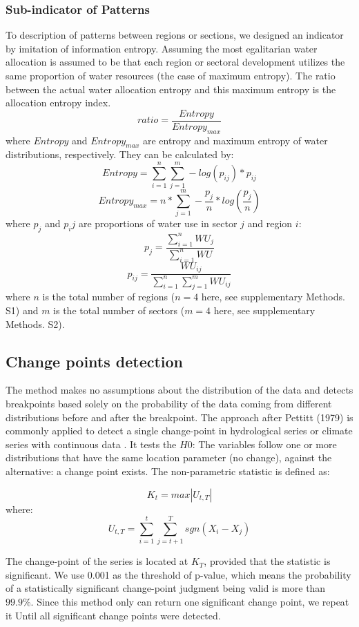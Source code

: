 \documentclass[9pt, twocolumn, twoside, lineno]{pnas-new}
\begin{document}
{	\subsubsection*{Sub-indicator of Patterns}
	To description of patterns between regions or sections, we designed an indicator by imitation of information entropy. Assuming the most egalitarian water allocation is assumed to be that each region or sectoral development utilizes the same proportion of water resources (the case of maximum entropy). The ratio between the actual water allocation entropy and this maximum entropy is the allocation entropy index.
	$$ ratio = \frac{Entropy}{Entropy_{max}} $$
	where $Entropy$ and $Entropy_{max}$ are entropy and maximum entropy of water distributions, respectively. They can be calculated by:
	$$ Entropy = \sum_{i=1}^n \sum_{j=1}^m -log(p_{ij}) * p_{ij} $$
	$$ Entropy_{max} = n * \sum_{j=1}^m -\frac{p_j}{n} * log(\frac{p_j}{n}) $$ 
	where $p_j$ and $p_ij$ are proportions of water use in sector $j$ and region $i$:
	$$ p_j = \frac{\sum_{i=1}^n WU_j}{\sum_{i=1}^n WU} $$
	$$ p_{ij} = \frac{WU_{ij}} {\sum_{i=1}^n \sum_{j=1}^m WU_{ij}} $$
	where $n$ is the total number of regions ($n=4$ here, see supplementary Methods. S1) and $m$ is the total number of sectors ($m=4$ here, see supplementary Methods. S2).

	\subsection*{Change points detection}
		The method makes no assumptions about the distribution of the data and detects breakpoints based solely on the probability of the data coming from different distributions before and after the breakpoint.
		The approach after Pettitt (1979) is commonly applied to detect a single change-point in hydrological series or climate series with continuous data \cite{pettittNonParametricApproachChangePoint1979}. It tests the $H0$: The variables follow one or more distributions that have the same location parameter (no change), against the alternative: a change point exists. The non-parametric statistic is defined as:
	
		$$ K_t = max|U_{t, T}|$$
		where:
		$$ U_{t, T} = \sum_{i=1}^t\sum_{j=t+1}^T sgn(X_i - X_j) $$
	
		The change-point of the series is located at $K_T$, provided that the statistic is significant. We use 0.001 as the threshold of p-value, which means the probability of a statistically significant change-point judgment being valid is more than $99.9\%$. Since this method only can return one significant change point, we repeat it Until all significant change points were detected.
	
}
\end{document}
